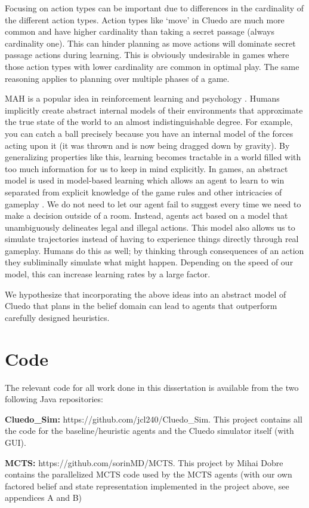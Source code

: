 \documentclass[msc, ai, twoside, notimes, logo, parskip, leftchapter, normalheadings]{infthesis}
\begin{document}
Focusing on action types can be important due to differences in the cardinality of the different action types. Action types like `move' in Cluedo are much more common and have higher cardinality than taking a secret passage (always cardinality one). This can hinder planning as move actions will dominate secret passage actions during learning. This is obviously undesirable in games where those action types with lower cardinality are common in optimal play. The same reasoning applies to planning over multiple phases of a game.

MAH is a popular idea in reinforcement learning and psychology \citep{Sutton-barto} \citep{Mihai}. Humans implicitly create abstract internal models of their environments that approximate the true state of the world to an almost indistinguishable degree. For example, you can catch a ball precisely because you have an internal model of the forces acting upon it (it was thrown and is now being dragged down by gravity). By generalizing properties like this, learning becomes tractable in a world filled with too much information for us to keep in mind explicitly. In games, an abstract model is used in model-based learning which allows an agent to learn to win separated from explicit knowledge of the game rules and other intricacies of gameplay \citep{Sutton-barto}. We do not need to let our agent fail to suggest every time we need to make a decision outside of a room. Instead, agents act based on a model that unambiguously delineates legal and illegal actions. This model also allows us to simulate trajectories instead of having to experience things directly through real gameplay. Humans do this as well; by thinking through consequences of an action they subliminally simulate what might happen. Depending on the speed of our model, this can increase learning rates by a large factor. 

We hypothesize that incorporating the above ideas into an abstract model of Cluedo that plans in the belief domain can lead to agents that outperform carefully designed heuristics.

\section{Code}
The relevant code for all work done in this dissertation is available from the two following Java repositories:
\begin{description}
\item \textbf{Cluedo\_Sim:} https://github.com/jcl240/Cluedo\_Sim. This project contains all the code for the baseline/heuristic agents and the Cluedo simulator itself (with GUI). 
\item \textbf{MCTS:} https://github.com/sorinMD/MCTS. This project by Mihai Dobre contains the parallelized MCTS code used by the MCTS agents (with our own factored belief and state representation implemented in the project above, see appendices A and B)
\end{description}
\end{document}
